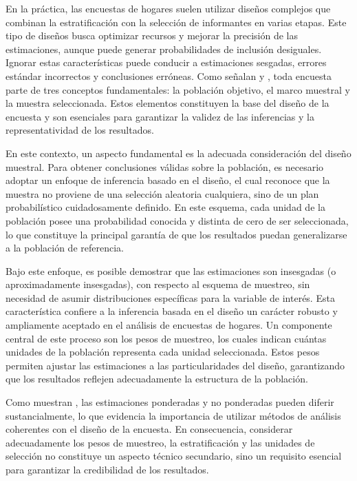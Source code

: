 \documentclass[
  spanish,
  12pt,
]{book}
\begin{document}
En la práctica, las encuestas de hogares suelen utilizar diseños complejos que combinan la estratificación con la selección de informantes en varias etapas. Este tipo de diseños busca optimizar recursos y mejorar la precisión de las estimaciones, aunque puede generar probabilidades de inclusión desiguales. Ignorar estas características puede conducir a estimaciones sesgadas, errores estándar incorrectos y conclusiones erróneas. Como señalan \citet{sarndal2003model} y \citet{Gutierrez2016}, toda encuesta parte de tres conceptos fundamentales: la población objetivo, el marco muestral y la muestra seleccionada. Estos elementos constituyen la base del diseño de la encuesta y son esenciales para garantizar la validez de las inferencias y la representatividad de los resultados.

En este contexto, un aspecto fundamental es la adecuada consideración del diseño muestral. Para obtener conclusiones válidas sobre la población, es necesario adoptar un enfoque de inferencia basado en el diseño, el cual reconoce que la muestra no proviene de una selección aleatoria cualquiera, sino de un plan probabilístico cuidadosamente definido. En este esquema, cada unidad de la población posee una probabilidad conocida y distinta de cero de ser seleccionada, lo que constituye la principal garantía de que los resultados puedan generalizarse a la población de referencia.

Bajo este enfoque, es posible demostrar que las estimaciones son insesgadas (o aproximadamente insesgadas), con respecto al esquema de muestreo, sin necesidad de asumir distribuciones específicas para la variable de interés. Esta característica confiere a la inferencia basada en el diseño un carácter robusto y ampliamente aceptado en el análisis de encuestas de hogares. Un componente central de este proceso son los pesos de muestreo, los cuales indican cuántas unidades de la población representa cada unidad seleccionada. Estos pesos permiten ajustar las estimaciones a las particularidades del diseño, garantizando que los resultados reflejen adecuadamente la estructura de la población.

Como muestran \citet{korn1995analysis}, las estimaciones ponderadas y no ponderadas pueden diferir sustancialmente, lo que evidencia la importancia de utilizar métodos de análisis coherentes con el diseño de la encuesta. En consecuencia, considerar adecuadamente los pesos de muestreo, la estratificación y las unidades de selección no constituye un aspecto técnico secundario, sino un requisito esencial para garantizar la credibilidad de los resultados.
\end{document}
